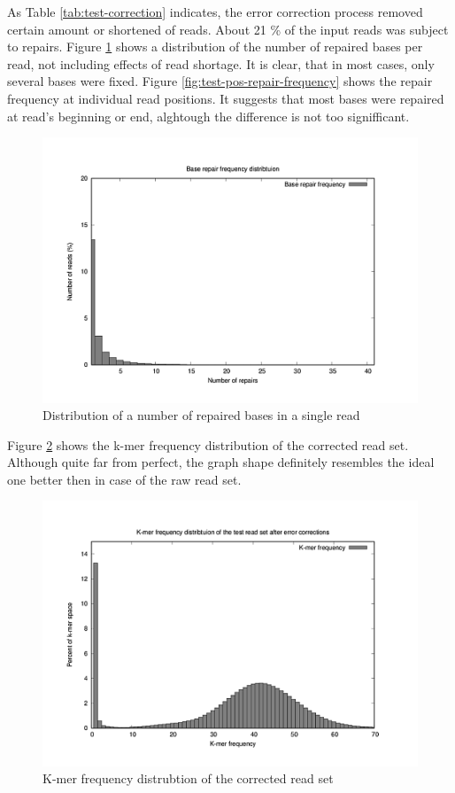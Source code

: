 As Table \ref{tab:test-correction} indicates, the error correction process removed certain amount or shortened of reads. About 21 \% of the input reads was subject to repairs. Figure \ref{fig:test-repair-frequency} shows a distribution of the number of repaired bases per read, not including effects of read shortage. It is clear, that in most cases, only several bases were fixed. Figure \ref{fig:test-pos-repair-frequency} shows the repair frequency at individual read positions. It suggests that most bases were repaired at read's beginning or end, alghtough the difference is not too signifficant.

\begin{figure}[h]
	\centering
	\includegraphics{img/test-repair-frequency.pdf}
	\caption{Distribution of a number of repaired bases in a single read}
	\label{fig:test-repair-frequency}
\end{figure}

Figure \ref{fig:test-kmer-frequency-distribution2} shows the k-mer frequency distribution of the corrected read set. Although quite far from perfect, the graph shape definitely resembles the ideal one better then in case of the raw  read set. 

\begin{figure}[h]
	\centering
	\includegraphics{img/test-kmer-frequency-distribution2.pdf}
	\caption{K-mer frequency distrubtion of the corrected read set}
	\label{fig:test-kmer-frequency-distribution2}
\end{figure}

